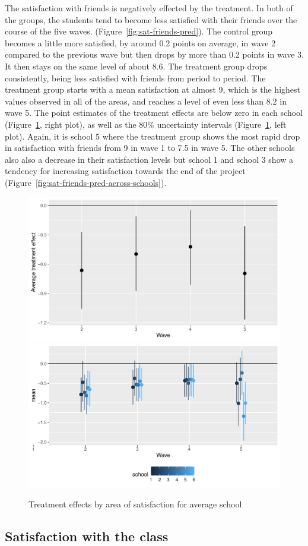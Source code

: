 \documentclass[a4, 12pt]{article}
\begin{document}
\label{sec:results-friends}
The satisfaction with friends is negatively effected by the treatment. In both of the groups, the students tend to become less satisfied with their friends over the course of the five waves. (Figure~\ref{fig:sat-friends-pred}). The control group becomes a little more satisfied, by around 0.2 points on average, in wave 2 compared to the previous wave but then drops by more than 0.2 points in wave 3. It then stays on the same level of about 8.6. The treatment group drops consistently, being less satisfied with friends from period to period. The treatment group starts with a mean satisfaction at almost 9, which is the highest values observed in all of the areas, and reaches a level of even less than 8.2 in wave 5. The point estimates of the treatment effects are below zero in each school (Figure~\ref{fig:friends}, right plot), as well as the 80\% uncertainty intervals (Figure~\ref{fig:friends}, left plot). Again, it is school 5 where the treatment group shows the most rapid drop in satisfaction with friends from 9 in wave 1 to 7.5 in wave 5. The other schools also also a decrease in their satisfaction levels but school 1 and school 3 show a tendency for increasing satisfaction towards the end of the project (Figure~\ref{fig:sat-friends-pred-across-schools}).

\begin{figure}[H]
\includegraphics[width=0.5\linewidth,]{../figures/sat_friends_teff} \includegraphics[width=0.5\linewidth,]{../figures/sat_friends_teff_across_schools} \caption{Treatment effects by area of satisfaction for average school}\label{fig:friends}
\end{figure}

\hypertarget{satisfaction-with-the-class}{%
\subsection{Satisfaction with the class}\label{satisfaction-with-the-class}}
\end{document}
